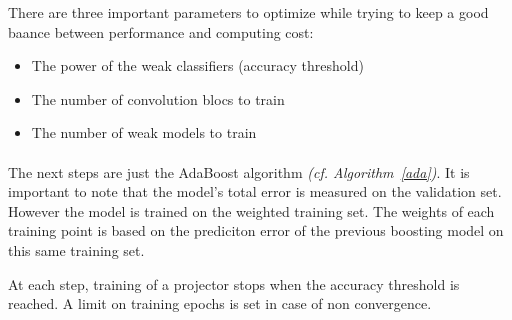 \documentclass[11 pt]{article}
\begin{document}
There are three important parameters to optimize while trying to keep a good baance between performance and computing cost:\\
\medskip

\begin{itemize}
  \item The power of the weak classifiers (accuracy threshold)
  \item The number of convolution blocs to train
  \item The number of weak models to train
\end{itemize}

\paragraph{}The next steps are just the AdaBoost algorithm \textit{(cf. Algorithm~\ref{ada})}. It is important to note that the model's total error is measured on the validation set. However the model is trained on the weighted training set. The weights of each training point is based on the prediciton error of the previous boosting model on this same training set.

At each step, training of a projector stops when the accuracy threshold is reached. A limit on training epochs is set in case of non convergence.\\
\end{document}
